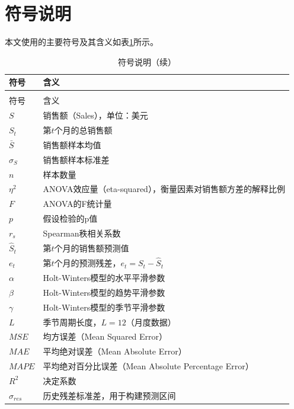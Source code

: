 

\section{符号说明}

本文使用的主要符号及其含义如表\ref{tab:符号说明}所示。

\begin{longtable}{>{\centering\arraybackslash}p{}>{\centering\arraybackslash}p{}}
  \caption{符号说明}
  \label{tab:符号说明} \\
  \toprule
  符号 & 含义 \\
  \midrule
  \endfirsthead
  \caption{符号说明（续）} \\
  \toprule
  符号 & 含义 \\
  \midrule
  \endhead
  \bottomrule
  \endfoot
  $S$ & 销售额（Sales），单位：美元 \\
  $S_t$ & 第$t$个月的总销售额 \\
  $\bar{S}$ & 销售额样本均值 \\
  $\sigma_S$ & 销售额样本标准差 \\
  $n$ & 样本数量 \\
  $\eta^2$ & ANOVA效应量（eta-squared），衡量因素对销售额方差的解释比例 \\
  $F$ & ANOVA的F统计量 \\
  $p$ & 假设检验的p值 \\
  $r_s$ & Spearman秩相关系数 \\
  $\hat{S}_t$ & 第$t$个月的销售额预测值 \\
  $e_t$ & 第$t$个月的预测残差，$e_t = S_t - \hat{S}_t$ \\
  $\alpha$ & Holt-Winters模型的水平平滑参数 \\
  $\beta$ & Holt-Winters模型的趋势平滑参数 \\
  $\gamma$ & Holt-Winters模型的季节平滑参数 \\
  $L$ & 季节周期长度，$L=12$（月度数据） \\
  $MSE$ & 均方误差（Mean Squared Error） \\
  $MAE$ & 平均绝对误差（Mean Absolute Error） \\
  $MAPE$ & 平均绝对百分比误差（Mean Absolute Percentage Error） \\
  $R^2$ & 决定系数 \\
  $\sigma_{res}$ & 历史残差标准差，用于构建预测区间 \\
\end{longtable}
